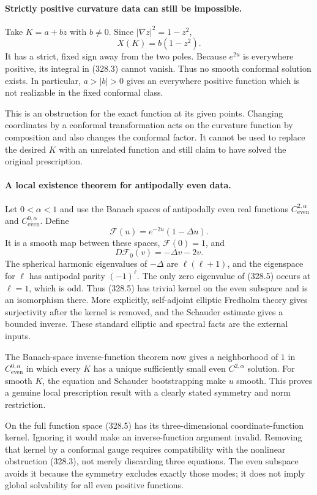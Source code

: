 \documentclass[11pt]{article}
\begin{document}
\paragraph{Strictly positive curvature data can still be impossible.}
Take $K=a+bz$ with $b\ne0$. Since $|\nabla z|^2=1-z^2$,
\[
 X(K)=b(1-z^2).
\]
It has a strict, fixed sign away from the two poles. Because
$e^{2u}$ is everywhere positive, its integral in (328.3) cannot
vanish. Thus no smooth conformal solution exists. In particular,
$a>|b|>0$ gives an everywhere positive function which is not
realizable in the fixed conformal class.

This is an obstruction for the exact function at its given points.
Changing coordinates by a conformal transformation acts on the
curvature function by composition and also changes the conformal
factor. It cannot be used to replace the desired $K$ with an
unrelated function and still claim to have solved the original
prescription.

\paragraph{A local existence theorem for antipodally even data.}
Let $0<\alpha<1$ and use the Banach spaces of antipodally even
real functions $C^{2,\alpha}_{\mathrm{even}}$ and
$C^{0,\alpha}_{\mathrm{even}}$. Define
\[
 \mathcal F(u)=e^{-2u}(1-\Delta u).
\]
It is a smooth map between these spaces, $\mathcal F(0)=1$, and
\[
 D\mathcal F_0(v)=-\Delta v-2v.
 \tag{328.5}
\]
The spherical harmonic eigenvalues of $-\Delta$ are
$\ell(\ell+1)$, and the eigenspace for $\ell$ has antipodal
parity $(-1)^\ell$. The only zero eigenvalue of (328.5) occurs
at $\ell=1$, which is odd. Thus (328.5) has trivial kernel on
the even subspace and is an isomorphism there. More explicitly,
self-adjoint elliptic Fredholm theory gives surjectivity after the
kernel is removed, and the Schauder estimate gives a bounded inverse.
These standard elliptic and spectral facts are the external inputs.

The Banach-space inverse-function theorem now gives a neighborhood
of $1$ in $C^{0,\alpha}_{\mathrm{even}}$ in which every $K$ has
a unique sufficiently small even $C^{2,\alpha}$ solution. For
smooth $K$, the equation and Schauder bootstrapping make $u$ smooth.
This proves a genuine local prescription result with a clearly
stated symmetry and norm restriction.

On the full function space (328.5) has its three-dimensional
coordinate-function kernel. Ignoring it would make an inverse-function
argument invalid. Removing that kernel by a conformal gauge requires
compatibility with the nonlinear obstruction (328.3), not merely
discarding three equations. The even subspace avoids it because
the symmetry excludes exactly those modes; it does not imply
global solvability for all even positive functions.
\end{document}

